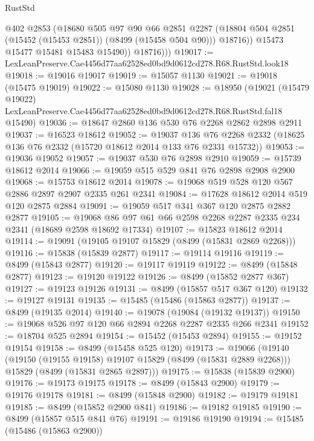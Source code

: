 \begin{lexlean}{RustStd}
\begin{coremodule}
                @402
                @2853
                (@18680
                  @505
                  @97
                  @90
                  @66
                  @2851
                  @2287
                  (@18804 @504 @2851 (@15452 (@15453 @2851)) (@8499 (@15458 @504 @90)))
                  @18716))
              @15473
              @15477
              @15481
              @15483
              @15490))
          @18716)))
@19017 := LexLeanPreserve.Cae4456d77aa62528ed0bd9d0612cd278.R68.RustStd.look18
@19018 := @19016 @19017
@19019 := @15057 @1130
@19021 := @19018 (@15475 @19019)
@19022 := @15080 @1130
@19028 := @18950
    (@19021
      (@15479 @19022)
      LexLeanPreserve.Cae4456d77aa62528ed0bd9d0612cd278.R68.RustStd.fal18
      @15490)
@19036 := @18647 @2860 @136 @530 @76 @2268 @2862 @2898 @2911
@19037 := @16523 @18612
@19052 := @19037
    @136
    @76
    @2268
    @2332
    (@18625 @136 @76 @2332 (@15720 @18612 @2014 @133 @76 @2331 @15732))
@19053 := @19036 @19052
@19057 := @19037 @530 @76 @2898 @2910
@19059 := @15739 @18612 @2014
@19066 := @19059 @515 @529 @841 @76 @2898 @2908 @2900
@19068 := @15753 @18612 @2014
@19078 := @19068 @519 @528 @120 @567 @2886 @2897 @2907 @2335 @261 @2341
@19084 := @17628 @18612 @2014 @519 @120 @2875 @2884
@19091 := @19059 @517 @341 @367 @120 @2875 @2882 @2877
@19105 := @19068 @86 @97 @61 @66 @2598 @2268 @2287 @2335 @234 @2341 (@18689 @2598 @18692 @17334)
@19107 := @15823 @18612 @2014
@19114 := @19091 (@19105 @19107 @15829 (@8499 (@15831 @2869 @2268)))
@19116 := @15838 (@15839 @2877)
@19117 := @19114 @19116
@19119 := @8499 (@15843 @2877)
@19120 := @19117 @19119
@19122 := @8499 (@15848 @2877)
@19123 := @19120 @19122
@19126 := @8499 (@15852 @2877 @367)
@19127 := @19123 @19126
@19131 := @8499 (@15857 @517 @367 @120)
@19132 := @19127 @19131
@19135 := @15485 (@15486 (@15863 @2877))
@19137 := @8499 (@19135 @2014)
@19140 := @19078 (@19084 (@19132 @19137))
@19150 := @19068 @526 @97 @120 @66 @2894 @2268 @2287 @2335 @266 @2341
@19152 := @18704 @525 @2894
@19154 := @15452 (@15453 @2894)
@19155 := @19152 @19154
@19158 := @8499 (@15458 @525 @120)
@19173 := @19066
    (@19140
      (@19150 (@19155 @19158) @19107 @15829 (@8499 (@15831 @2889 @2268)))
      @15829
      (@8499 (@15831 @2865 @2897)))
@19175 := @15838 (@15839 @2900)
@19176 := @19173 @19175
@19178 := @8499 (@15843 @2900)
@19179 := @19176 @19178
@19181 := @8499 (@15848 @2900)
@19182 := @19179 @19181
@19185 := @8499 (@15852 @2900 @841)
@19186 := @19182 @19185
@19190 := @8499 (@15857 @515 @841 @76)
@19191 := @19186 @19190
@19194 := @15485 (@15486 (@15863 @2900))

\end{coremodule}
\end{lexlean}
